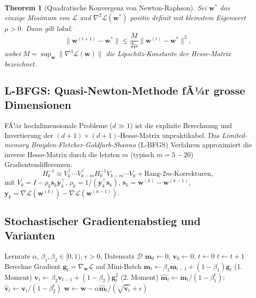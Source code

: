 ﻿\documentclass[12pt, a4paper]{article}
\newtheorem{theorem}{Theorem}[section]
\theoremstyle{definition}
\theoremstyle{remark}
\newcommand{\vw}{\bm{w}}
\newcommand{\T}{\top}
\begin{document}
\begin{theorem}[Quadratische Konvergenz von Newton-Raphson]
  Sei $\vw^*$ das einzige Minimum von $\mathcal{L}$ und $\nabla^2\mathcal{L}(\vw^*)$ positiv definit
  mit kleinstem Eigenwert $\mu > 0$. Dann gilt lokal:
  \begin{equation}
    \|\vw^{(t+1)} - \vw^*\| \leq \frac{M}{2\mu} \|\vw^{(t)} - \vw^*\|^2,
    \label{eq:newton_convergence}
  \end{equation}
  wobei $M = \sup_{\vw} \|\nabla^3\mathcal{L}(\vw)\|$ die Lipschitz-Konstante der Hesse-Matrix bezeichnet.
\end{theorem}

\subsection{L-BFGS: Quasi-Newton-Methode fÃ¼r grosse Dimensionen}

FÃ¼r hochdimensionale Probleme ($d \gg 1$) ist die explizite Berechnung und Invertierung der
$(d+1)\times(d+1)$-Hesse-Matrix unpraktikabel. Das \emph{Limited-memory Broyden-Fletcher-Goldfarb-Shanno}
(L-BFGS) Verfahren approximiert die inverse Hesse-Matrix durch die letzten $m$ (typisch $m=5-20$)
Gradientendifferenzen:
\begin{equation}
  H_k^{-1} \approx V_k^\T \cdots V_{k-m}^\T H_0^{-1} V_{k-m} \cdots V_k + \text{Rang-}2m\text{-Korrekturen},
\end{equation}
mit $V_k = I - \rho_k \bm{s}_k\bm{y}_k^\T$, $\rho_k = 1/(\bm{y}_k^\T\bm{s}_k)$,
$\bm{s}_k = \vw^{(k)}-\vw^{(k-1)}$, $\bm{y}_k = \nabla\mathcal{L}(\vw^{(k)})-\nabla\mathcal{L}(\vw^{(k-1)})$.

\subsection{Stochastischer Gradientenabstieg und Varianten}

\begin{algorithm}[H]
  \caption{Adam-Optimizer fÃ¼r logistische Regression}
  \label{alg:adam}
  \begin{algorithmic}[1]
    \Require Lernrate $\alpha$, $\beta_1, \beta_2 \in [0,1)$, $\epsilon > 0$, Datensatz $\mathcal{D}$
    \State $\bm{m}_0 \leftarrow 0$, $\bm{v}_0 \leftarrow 0$, $t \leftarrow 0$
      \State $t \leftarrow t+1$
      \State Berechne Gradient $\bm{g}_t = \nabla_{\vw}\mathcal{L}$ auf Mini-Batch
      \State $\bm{m}_t \leftarrow \beta_1 \bm{m}_{t-1} + (1-\beta_1)\bm{g}_t$ \hfill (1. Moment)
      \State $\bm{v}_t \leftarrow \beta_2 \bm{v}_{t-1} + (1-\beta_2)\bm{g}_t^2$ \hfill (2. Moment)
      \State $\hat{\bm{m}}_t \leftarrow \bm{m}_t/(1-\beta_1^t)$; $\hat{\bm{v}}_t \leftarrow \bm{v}_t/(1-\beta_2^t)$
      \State $\vw \leftarrow \vw - \alpha \hat{\bm{m}}_t/(\sqrt{\hat{\bm{v}}_t}+\epsilon)$
    \EndWhile
  \end{algorithmic}
\end{algorithm}
\end{document}
